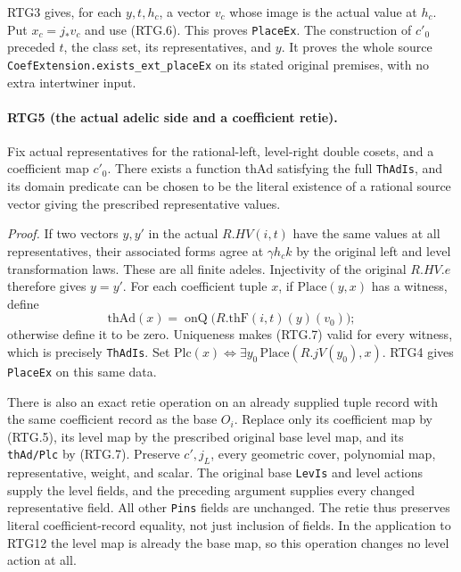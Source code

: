 RTG3 gives, for each $y,t,h_c$, a vector $v_c$ whose image is the
actual value at $h_c$.  Put $x_c=j_*v_c$ and use (RTG.6).
This proves \texttt{PlaceEx}.  The construction of $c'_0$ preceded
$t$, the class set, its representatives, and $y$.  It proves the whole
source \texttt{CoefExtension.exists\_\allowbreak ext\_\allowbreak placeEx} on its stated
original premises, with no extra intertwiner input.

\paragraph{RTG5 (the actual adelic side and a coefficient retie).}
\label{claim:RTG5}
Fix actual representatives for the rational-left, level-right double
cosets, and a coefficient map $c'_0$.  There exists a function
$\mathrm{thAd}$ satisfying the full \texttt{ThAdIs}, and its domain
predicate can be chosen to be the literal existence of a rational source
vector giving the prescribed representative values.

\emph{Proof.}
If two vectors $y,y'$ in the actual $R.HV(i,t)$ have the same values
at all representatives, their associated forms agree at
$\gamma h_c k$ by the original left and level transformation laws.
These are all finite adeles.  Injectivity of the original $R.HV.e$
therefore gives $y=y'$.  For each coefficient tuple $x$, if
$\mathrm{Place}(y,x)$ has a witness, define
\[
 \mathrm{thAd}(x)=\operatorname{onQ}
       \bigl(R.\mathrm{thF}(i,t)(y)(v_0)\bigr);
                                                               \tag{RTG.7}
\]
otherwise define it to be zero.  Uniqueness makes (RTG.7) valid for
every witness, which is precisely \texttt{ThAdIs}.  Set
$\mathrm{Plc}(x)\iff\exists y_0\,\mathrm{Place}(R.jV(y_0),x)$.
RTG4 gives \texttt{PlaceEx} on this same data.

There is also an exact retie operation on an already supplied tuple
record with the same coefficient record as the base $O_i$.  Replace only its coefficient map by (RTG.5), its level map by
the prescribed original base level map, and its \texttt{thAd/Plc} by
(RTG.7).  Preserve $c',j_L$, every geometric cover, polynomial map,
representative, weight, and scalar.  The original base
\texttt{LevIs} and level actions supply the level fields, and the
preceding argument supplies every changed representative field.
All other \texttt{Pins} fields are unchanged.  The retie thus preserves
literal coefficient-record equality, not just inclusion of fields.
In the application to RTG12 the level map is already the base map, so
this operation changes no level action at all.


